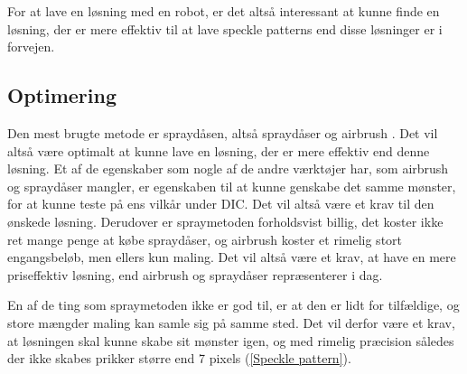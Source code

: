 For at lave en løsning med en robot, er det altså interessant at kunne finde en løsning, der er mere effektiv til at lave speckle patterns end disse løsninger er i forvejen.

\subsection{Optimering} Den mest brugte metode er spraydåsen, altså spraydåser og airbrush \parencite{Dong2017ACorrelation, Quino2021SpeckleEndurance}. Det vil altså være optimalt at kunne lave en løsning, der er mere effektiv end denne løsning. Et af de egenskaber som nogle af de andre værktøjer har, som airbrush og spraydåser mangler, er egenskaben til at kunne genskabe det samme mønster, for at kunne teste på ens vilkår under DIC. Det vil altså være et krav til den ønskede løsning. Derudover er spraymetoden forholdsvist billig, det koster ikke ret mange penge at købe spraydåser, og airbrush koster et rimelig stort engangsbeløb, men ellers kun maling. Det vil altså være et krav, at have en mere priseffektiv løsning, end airbrush og spraydåser repræsenterer i dag.

En af de ting som spraymetoden ikke er god til, er at den er lidt for tilfældige, og store mængder maling kan samle sig på samme sted. Det vil derfor være et krav, at løsningen skal kunne skabe sit mønster igen, og med rimelig præcision således der ikke skabes prikker større end 7 pixels (\ref{Speckle pattern}).